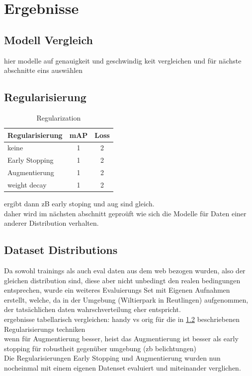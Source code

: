 \section{Ergebnisse}\label{sec:results}

\subsection{Modell Vergleich}

hier modelle auf genauigkeit und geschwindig keit vergleichen 
und für nächste abschnitte eins auswählen



\subsection{Regularisierung}\label{subsec:regularization}

\begin{table}[htb]
    \centering
    \label{tab:regularization}
    \begin{tabular}{| l || c | c |} 
        \hline
        Regularisierung & mAP & Loss\\
        \hline
        keine & 1 & 2 \\
        \hline
        Early Stopping & 1 & 2 \\
        \hline
        Augmentierung & 1 & 2 \\
        \hline
        weight decay & 1 & 2 \\
        \hline
    \end{tabular}        
    \caption{Regularization}
\end{table}


ergibt dann zB early stoping und aug sind gleich.
\\
daher wird im nächsten abschnitt geproüft wie sich 
die Modelle für Daten einer anderer Distribution verhalten.


\subsection{Dataset Distributions}\label{subsec:distributions}
Da sowohl trainings als auch eval daten aus dem web bezogen wurden,
also der gleichen distribution sind, diese aber nicht unbedingt 
den realen bedingungen entsprechen, wurde ein weiteres Evaluierungs 
Set mit Eigenen Aufnahmen erstellt, welche, da in der Umgebung 
(Wiltierpark in Reutlingen) aufgenommen, der tatsächlichen daten 
wahrschverteilung eher entspricht.
\\
ergebnisse tabellarisch vergleichen: handy vs orig für die in 
\ref{subsec:regularization} beschriebenen Regularisierungs techniken\\
wenn für Augmentierung besser, heist das Augmentierung ist besser als 
early stopping für robustheit gegenüber umgebung (zb belichtungen)
\\
Die Regularisierungen Early Stopping und Augmentierung wurden 
nun nocheinmal mit einem eigenen Datenset evaluiert und miteinander 
verglichen.


